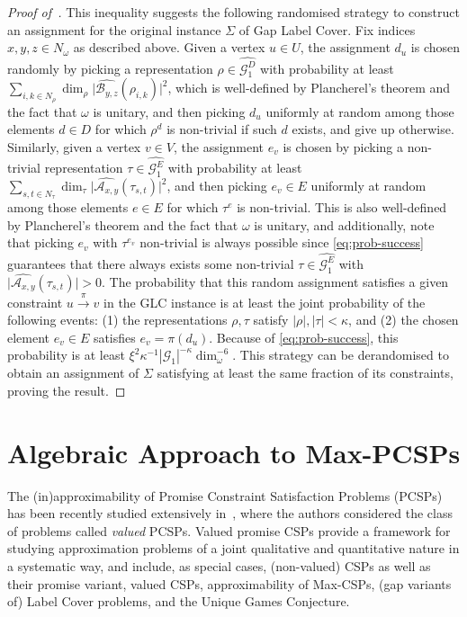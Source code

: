 \documentclass[a4paper,11pt]{article}
\theoremstyle{definition}
\newcommand{\gr}{\mathscr{G}}
\newcommand{\A}{\mathcal{A}}
\newcommand{\B}{\mathcal{B}}
\begin{document}
\begin{proof}[Proof of~]
This inequality suggests the following randomised strategy to construct an assignment for the original instance $\Sigma$ of Gap Label Cover. Fix indices $x,y,z \in N_\omega$ as described above. Given a vertex $u\in U$, the assignment $d_u$ is chosen randomly by picking a representation $\rho \in \widehat{\gr_1^D}$ 
with probability at least
$\sum_{i,k\in N_\rho} \dim_\rho \vert\widehat{{\B}_{y,z}}(\rho_{i,k} )\vert^2$, which is well-defined by Plancherel's theorem and the fact that $\omega$ is unitary, and then picking $d_u$ uniformly at random among those elements $d\in D$ for which $\rho^d$ is non-trivial if such $d$ exists, and give up otherwise. Similarly, given a vertex $v\in V$, the assignment $e_v$ is chosen by picking a 
non-trivial representation $\tau  \in \widehat{\gr_1^E}$ 
with probability at least
$\sum_{s,t\in N_\tau} \dim_\tau \vert\widehat{\A_{x,y}}(\tau_{s,t})\vert^2$, and then picking $e_v\in E$ uniformly at random among those elements $e\in E$ for which $\tau^e$ is non-trivial. This is also well-defined by Plancherel's theorem and the fact that $\omega$ is unitary, and additionally, note that picking $e_v$ with $\tau^{e_v}$ non-trivial is always possible since \eqref{eq:prob-success} guarantees that there always exists some non-trivial $\tau \in \widehat{\gr_1^E}$ with $\vert\widehat{\A_{x,y}}(\tau_{s,t})\vert>0$. The probability that this random assignment satisfies a given constraint $u \xrightarrow{\pi} v$ in the GLC instance is at least
the joint probability of the following events: (1) the representations $\rho, \tau$ satisfy  $|\rho|, |\tau| < \kappa$,
and
(2) the chosen element $e_v\in E$ satisfies $e_v = \pi(d_u)$.
Because of \eqref{eq:prob-success}, this probability is at least
$\xi^2\kappa^{-1}|\gr_1|^{-\kappa}\dim_\omega^{-6}$. This strategy can be
derandomised to obtain an assignment of $\Sigma$ satisfying at least the same fraction of its constraints, proving the result. 
\end{proof}

\section{Algebraic Approach to Max-PCSPs} \label{sec:algebraic-approach}

The (in)approximability of Promise Constraint Satisfaction Problems (PCSPs) has
been recently studied extensively in~\cite{Barto24:lics}, where the authors
considered the class of problems called \emph{valued} PCSPs. 
%
Valued promise CSPs provide a framework for studying approximation problems of a joint
qualitative and quantitative nature in a systematic way, and include, as special
cases, (non-valued) CSPs as well as their promise variant,
valued CSPs, approximability of Max-CSPs, (gap variants of) Label Cover problems, and the Unique Games Conjecture. 
\end{document}
